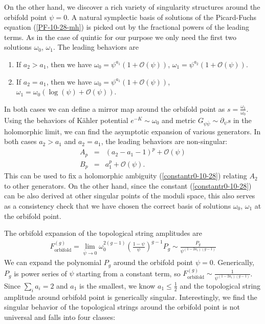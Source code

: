 \documentclass[12pt]{article}
\begin{document}
On the other hand, we discover a rich variety of singularity
structures around the orbifold point $\psi=0$. A natural
symplectic basis of solutions of the Picard-Fuchs equation
(\ref{PF-10-28-mh}) is picked out by the fractional powers of the
leading terms. As in the case of quintic for our purpose we only
need the first two solutions $\omega_0$, $\omega_1$. The leading
behaviors are
\begin{enumerate}
\item If $a_2>a_1$, then we have
$\omega_0=\psi^{a_1}(1+\mathcal{O}(\psi))$,
$\omega_1=\psi^{a_2}(1+\mathcal{O}(\psi))$.
\item If $a_2=a_1$, then we have
$\omega_0=\psi^{a_1}(1+\mathcal{O}(\psi))$,
$\omega_1=\omega_0(\log(\psi)+\mathcal{O}(\psi))$.
\end{enumerate}
In both cases we can define a mirror map around the orbifold point
as $s=\frac{\omega_1}{\omega_0}$. Using the behaviors of
K\"ahler potential $e^{-K}\sim \omega_0$ and metric
$G_{\psi\bar{\psi}}\sim
\partial_\psi s$ in the
holomorphic limit, we can find the asymptotic expansion of various
generators. In both cases $a_2>a_1$ and $a_2=a_1$, the leading
behaviors are non-singular:
\begin{eqnarray}
A_p &=& (a_2-a_1-1)^p+\mathcal{O}(\psi) \nonumber \\
B_p &=& a_1^p+\mathcal{O}(\psi).
\end{eqnarray}
This can be used to fix a holomorphic ambiguity
(\ref{constantr0-10-28}) relating $A_2$ to other generators. On
the other hand, since the constant (\ref{constantr0-10-28})  can
be also derived at other singular points of the moduli space, this
also serves as a consistency check that we have chosen the correct
basis of solutions $\omega_0$, $\omega_1$ at the orbifold point.

The orbifold expansion of the topological string amplitudes are
\begin{eqnarray}
F^{(g)}_{\textrm{orbifold}}=\lim_{\bar{\psi}\rightarrow 0
}\omega_0^{2(g-1)}(\frac{1-\psi}{\psi})^{g-1}P_g\sim
\frac{P_g}{\psi^{(1-2a_1)(g-1)}}
\end{eqnarray}
We can expand the polynomial $P_g$ around the orbifold point
$\psi=0$. Generically, $P_g$ is power series of $\psi$ starting
from a constant term, so $F^{(g)}_{\textrm{orbifold}}\sim
\frac{1}{\psi^{(1-2a_1)(g-1)}}$. Since $\sum_ia_i=2$ and $a_1$ is
the smallest, we know $a_1\leq \frac{1}{2}$ and the topological
string amplitude around orbifold point is generically singular.
Interestingly, we find the singular behavior of the topological
strings around the orbifold point is not universal and falls into
four classes:
\end{document}
